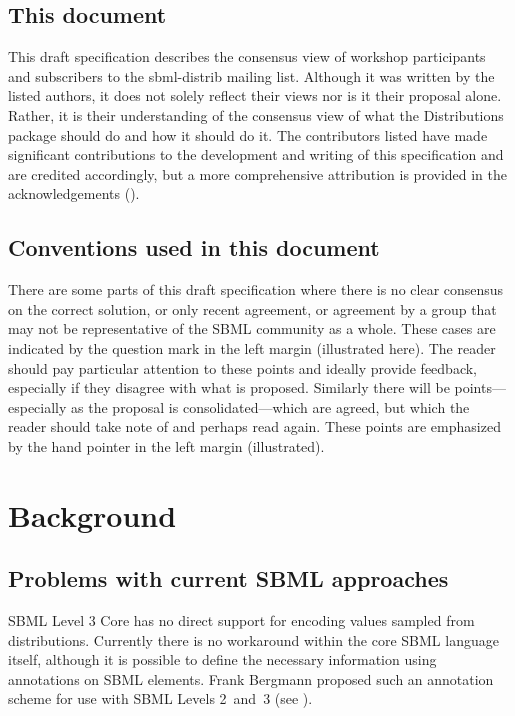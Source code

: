\documentclass[draftspec]{sbmlpkgspec}
\newcommand{\distrib}{Distributions\xspace}
\newcommand{\watchout}{\marginpar{\hspace*{34pt}\raisebox{-0.5ex}{\Large\ding{43}}}}
\newcommand{\controversial}{\marginpar{\hspace*{34pt}\raisebox{-0.5ex}{\Large?}}}
\begin{document}
\subsection{This document}

This draft specification describes the consensus view of workshop participants and subscribers to the sbml-distrib mailing list. Although it was written by the listed authors, it does not solely reflect their views nor is it their proposal alone. Rather, it is their understanding of the consensus view of what the \distrib package should do and how it should do it. The contributors listed have made significant contributions to the development and writing of this specification and are credited accordingly, but a more comprehensive attribution is provided in the acknowledgements ().

\subsection{Conventions used in this document}

There are some
parts of this draft specification where there is no clear consensus on the
correct solution, or only recent agreement, or agreement by a group
that may not be representative of the SBML community as a
whole. These cases are indicated by the \controversial question mark
in the left margin (illustrated here). The reader should pay particular
attention to these points and ideally provide feedback, especially if
they disagree with what is proposed. Similarly there will be points---especially as the proposal is consolidated---which are agreed,
but which the reader should take note of and perhaps read again. These
points \watchout are emphasized by the hand pointer in the left margin
(illustrated).

\section{Background}

\subsection{Problems with current SBML approaches}

SBML Level 3 Core has no direct support for encoding values sampled from distributions. Currently there is no workaround within the core SBML
language itself, although it is possible to define the necessary information
using annotations on SBML elements. Frank Bergmann proposed such an annotation scheme for use with SBML Levels 2~and~3 (see ).
\end{document}
